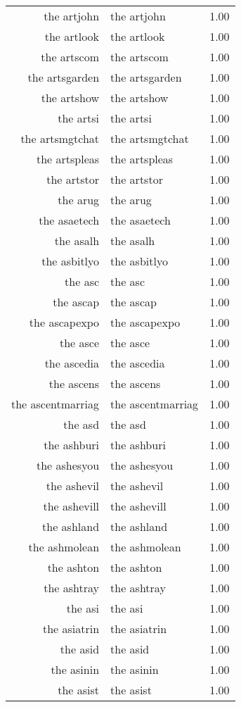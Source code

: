 \begin{table}[ht]
\begin{tabular}{rlr}
  the artjohn & the artjohn & 1.00 \\ 
  the artlook & the artlook & 1.00 \\ 
  the artscom & the artscom & 1.00 \\ 
  the artsgarden & the artsgarden & 1.00 \\ 
  the artshow & the artshow & 1.00 \\ 
  the artsi & the artsi & 1.00 \\ 
  the artsmgtchat & the artsmgtchat & 1.00 \\ 
  the artspleas & the artspleas & 1.00 \\ 
  the artstor & the artstor & 1.00 \\ 
  the arug & the arug & 1.00 \\ 
  the asaetech & the asaetech & 1.00 \\ 
  the asalh & the asalh & 1.00 \\ 
  the asbitlyo & the asbitlyo & 1.00 \\ 
  the asc & the asc & 1.00 \\ 
  the ascap & the ascap & 1.00 \\ 
  the ascapexpo & the ascapexpo & 1.00 \\ 
  the asce & the asce & 1.00 \\ 
  the ascedia & the ascedia & 1.00 \\ 
  the ascens & the ascens & 1.00 \\ 
  the ascentmarriag & the ascentmarriag & 1.00 \\ 
  the asd & the asd & 1.00 \\ 
  the ashburi & the ashburi & 1.00 \\ 
  the ashesyou & the ashesyou & 1.00 \\ 
  the ashevil & the ashevil & 1.00 \\ 
  the ashevill & the ashevill & 1.00 \\ 
  the ashland & the ashland & 1.00 \\ 
  the ashmolean & the ashmolean & 1.00 \\ 
  the ashton & the ashton & 1.00 \\ 
  the ashtray & the ashtray & 1.00 \\ 
  the asi & the asi & 1.00 \\ 
  the asiatrin & the asiatrin & 1.00 \\ 
  the asid & the asid & 1.00 \\ 
  the asinin & the asinin & 1.00 \\ 
  the asist & the asist & 1.00 \\ 

\end{tabular}
\end{table}
